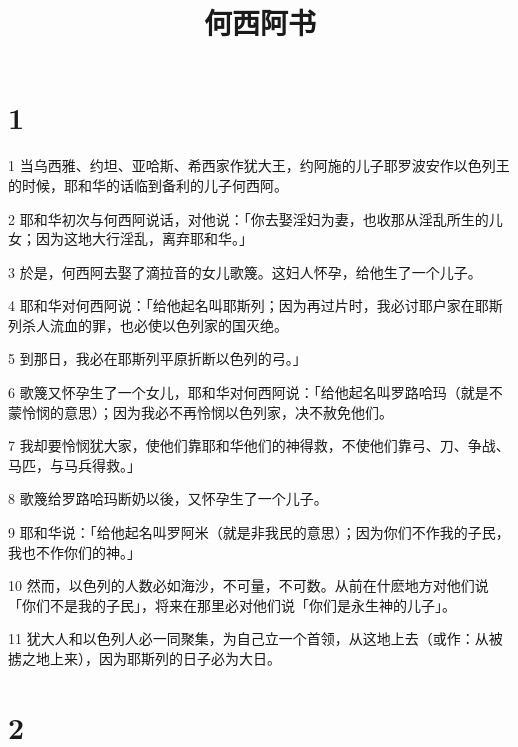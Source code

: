 

\title{何西阿书}


\chapter{1}

\par 1 当乌西雅、约坦、亚哈斯、希西家作犹大王，约阿施的儿子耶罗波安作以色列王的时候，耶和华的话临到备利的儿子何西阿。
\par 2 耶和华初次与何西阿说话，对他说：「你去娶淫妇为妻，也收那从淫乱所生的儿女；因为这地大行淫乱，离弃耶和华。」
\par 3 於是，何西阿去娶了滴拉音的女儿歌篾。这妇人怀孕，给他生了一个儿子。
\par 4 耶和华对何西阿说：「给他起名叫耶斯列；因为再过片时，我必讨耶户家在耶斯列杀人流血的罪，也必使以色列家的国灭绝。
\par 5 到那日，我必在耶斯列平原折断以色列的弓。」
\par 6 歌篾又怀孕生了一个女儿，耶和华对何西阿说：「给他起名叫罗路哈玛（就是不蒙怜悯的意思）；因为我必不再怜悯以色列家，决不赦免他们。
\par 7 我却要怜悯犹大家，使他们靠耶和华他们的神得救，不使他们靠弓、刀、争战、马匹，与马兵得救。」
\par 8 歌篾给罗路哈玛断奶以後，又怀孕生了一个儿子。
\par 9 耶和华说：「给他起名叫罗阿米（就是非我民的意思）；因为你们不作我的子民，我也不作你们的神。」
\par 10 然而，以色列的人数必如海沙，不可量，不可数。从前在什麽地方对他们说「你们不是我的子民」，将来在那里必对他们说「你们是永生神的儿子」。
\par 11 犹大人和以色列人必一同聚集，为自己立一个首领，从这地上去（或作：从被掳之地上来），因为耶斯列的日子必为大日。

\chapter{2}

